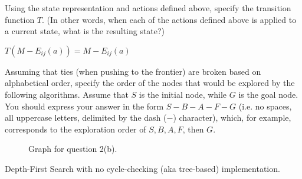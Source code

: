 \begin{listo}
\begin{listu}
        \item Using the state representation and actions defined above, specify the transition function $T$. (In other words, when each of the actions defined above is applied to a current state, what is the resulting state?)
        
        \begin{solution}
                $T(M - E_{ij}(a)) = M - E_{ij}(a)$
        \end{solution}
    \end{listu}

    \item Assuming that ties (when pushing to the frontier) are broken based on alphabetical order, specify the order of the nodes that would be explored by the following algorithms. Assume that $S$ is the initial node, while $G$ is the goal node. You should express your answer in the form $S - B - A - F - G$ (i.e. no spaces, all uppercase letters, delimited by the dash ($-$) character), which, for example, corresponds to the exploration order of $S, B, A, F$, then $G$.

    \begin{figure}[ht!]
        \centering

        \tikzexternalenable
        \tikzexternaldisable
        
        \caption{Graph for question 2(b).}
    \end{figure}

    \begin{listo}
        \item Depth-First Search with no cycle-checking (aka tree-based) implementation.


\end{listo}
\end{listo}
